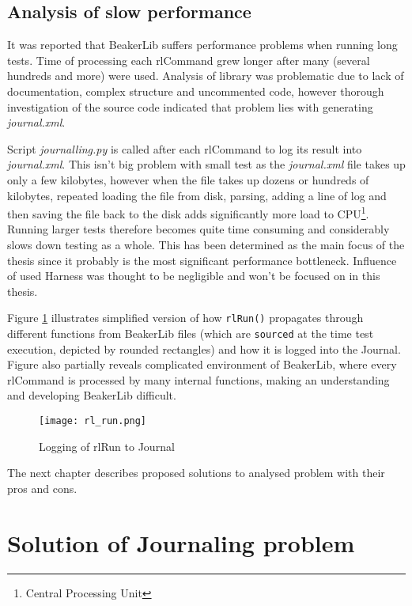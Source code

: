\section{Analysis of slow performance}
It was reported that BeakerLib suffers performance problems when running long tests. Time of processing each rlCommand grew longer after many (several hundreds and more) were used. Analysis of library was problematic due to lack of documentation, complex structure and uncommented code, however thorough investigation of the source code indicated that problem lies with generating \textit{journal.xml}. 

Script \textit{journalling.py} is called after each rlCommand to log its result into \textit{journal.xml}. This isn't big problem with small test as the \textit{journal.xml} file takes up only a few kilobytes, however when the file takes up dozens or hundreds of kilobytes, repeated loading the file from disk, parsing, adding a line of log and then saving the file back to the disk adds significantly more load to CPU\footnote{Central Processing Unit}. Running larger tests therefore becomes quite time consuming and considerably slows down testing as a whole.
This has been determined as the main focus of the thesis since it probably is the most significant performance bottleneck. Influence of used Harness was thought  to be negligible and won't be focused on in this thesis.

Figure \ref{fig:rl_run} illustrates simplified version of how \texttt{rlRun()} propagates through different functions from BeakerLib files (which are \texttt{sourced} at the time test execution,  depicted by rounded rectangles) and how it is logged into the Journal. Figure also partially reveals complicated environment of BeakerLib, where every rlCommand is processed by many internal functions, making an understanding and developing BeakerLib difficult. 

\begin{figure}[h!]
  \texttt{[image: rl\_run.png]}
  \caption{Logging of rlRun to Journal}
  \label{fig:rl_run}
\end{figure}


The next chapter describes proposed solutions to analysed problem with their pros and cons.


\chapter{Solution of Journaling problem}
\label{solutions}

